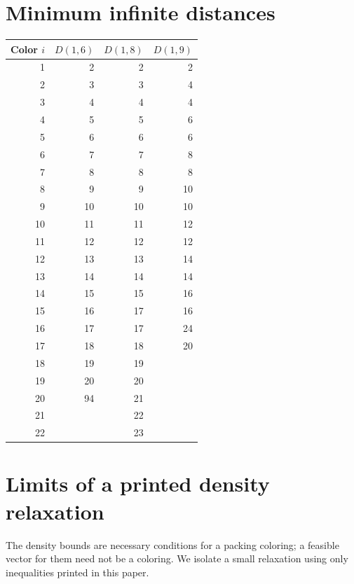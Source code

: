 \documentclass[11pt,reqno]{amsart}
\theoremstyle{plain}
\newcommand{\D}[1]{D(1,#1)}
\theoremstyle{plain}
\theoremstyle{plain}
\begin{document}
\section{Minimum infinite distances}\label{S-supp:minima}

\begin{center}
\begin{tabular}{rrrr}
\toprule
Color $i$ & $\D{6}$ & $\D{8}$ & $\D{9}$ \\
\midrule
1 & 2 & 2 & 2 \\
2 & 3 & 3 & 4 \\
3 & 4 & 4 & 4 \\
4 & 5 & 5 & 6 \\
5 & 6 & 6 & 6 \\
6 & 7 & 7 & 8 \\
7 & 8 & 8 & 8 \\
8 & 9 & 9 & 10 \\
9 & 10 & 10 & 10 \\
10 & 11 & 11 & 12 \\
11 & 12 & 12 & 12 \\
12 & 13 & 13 & 14 \\
13 & 14 & 14 & 14 \\
14 & 15 & 15 & 16 \\
15 & 16 & 17 & 16 \\
16 & 17 & 17 & 24 \\
17 & 18 & 18 & 20 \\
18 & 19 & 19 & \text{--} \\
19 & 20 & 20 & \text{--} \\
20 & 94 & 21 & \text{--} \\
21 & \text{--} & 22 & \text{--} \\
22 & \text{--} & 23 & \text{--} \\
\bottomrule
\end{tabular}
\end{center}



\section{Limits of a printed density relaxation}\label{S-app:limits}

The density bounds are necessary conditions for a packing coloring; a
feasible vector for them need not be a coloring. We isolate a small
relaxation using only inequalities printed in this paper.
\end{document}
